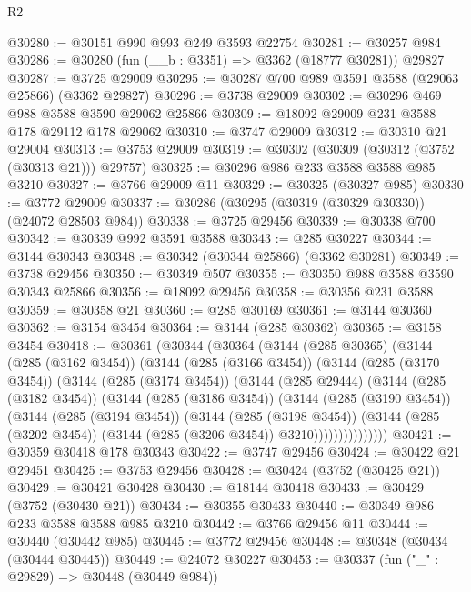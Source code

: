 \begin{lexlean}{R2}
\begin{coremodule}
@30280 := @30151 @990 @993 @249 @3593 @22754
@30281 := @30257 @984
@30286 := @30280 (fun (__b : @3351) => @3362 (@18777 @30281)) @29827
@30287 := @3725 @29009
@30295 := @30287 @700 @989 @3591 @3588 (@29063 @25866) (@3362 @29827)
@30296 := @3738 @29009
@30302 := @30296 @469 @988 @3588 @3590 @29062 @25866
@30309 := @18092 @29009 @231 @3588 @178 @29112 @178 @29062
@30310 := @3747 @29009
@30312 := @30310 @21 @29004
@30313 := @3753 @29009
@30319 := @30302 (@30309 (@30312 (@3752 (@30313 @21))) @29757)
@30325 := @30296 @986 @233 @3588 @3588 @985 @3210
@30327 := @3766 @29009 @11
@30329 := @30325 (@30327 @985)
@30330 := @3772 @29009
@30337 := @30286 (@30295 (@30319 (@30329 @30330)) (@24072 @28503 @984))
@30338 := @3725 @29456
@30339 := @30338 @700
@30342 := @30339 @992 @3591 @3588
@30343 := @285 @30227
@30344 := @3144 @30343
@30348 := @30342 (@30344 @25866) (@3362 @30281)
@30349 := @3738 @29456
@30350 := @30349 @507
@30355 := @30350 @988 @3588 @3590 @30343 @25866
@30356 := @18092 @29456
@30358 := @30356 @231 @3588
@30359 := @30358 @21
@30360 := @285 @30169
@30361 := @3144 @30360
@30362 := @3154 @3454
@30364 := @3144 (@285 @30362)
@30365 := @3158 @3454
@30418 := @30361
    (@30344
      (@30364
        (@3144
          (@285 @30365)
          (@3144
            (@285 (@3162 @3454))
            (@3144
              (@285 (@3166 @3454))
              (@3144
                (@285 (@3170 @3454))
                (@3144
                  (@285 (@3174 @3454))
                  (@3144
                    (@285 @29444)
                    (@3144
                      (@285 (@3182 @3454))
                      (@3144
                        (@285 (@3186 @3454))
                        (@3144
                          (@285 (@3190 @3454))
                          (@3144
                            (@285 (@3194 @3454))
                            (@3144
                              (@285 (@3198 @3454))
                              (@3144
                                (@285 (@3202 @3454))
                                (@3144 (@285 (@3206 @3454)) @3210)))))))))))))))
@30421 := @30359 @30418 @178 @30343
@30422 := @3747 @29456
@30424 := @30422 @21 @29451
@30425 := @3753 @29456
@30428 := @30424 (@3752 (@30425 @21))
@30429 := @30421 @30428
@30430 := @18144 @30418
@30433 := @30429 (@3752 (@30430 @21))
@30434 := @30355 @30433
@30440 := @30349 @986 @233 @3588 @3588 @985 @3210
@30442 := @3766 @29456 @11
@30444 := @30440 (@30442 @985)
@30445 := @3772 @29456
@30448 := @30348 (@30434 (@30444 @30445))
@30449 := @24072 @30227
@30453 := @30337 (fun ("_" : @29829) => @30448 (@30449 @984))

\end{coremodule}
\end{lexlean}
